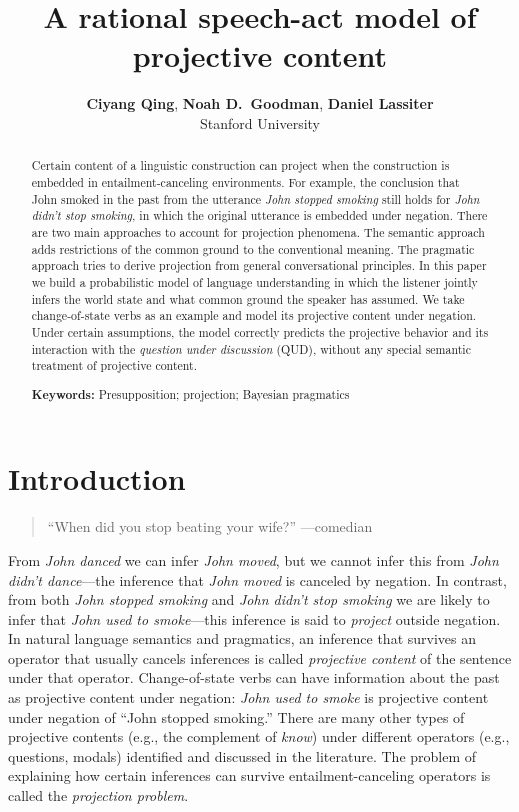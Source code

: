 \documentclass[10pt,letterpaper]{article}
\title{A rational speech-act model of projective content}
\author{{\large \bf Ciyang Qing}, {\large \bf Noah D.~Goodman}, {\large \bf Daniel Lassiter}\\
Stanford University}
\begin{document}
\maketitle
 
\begin{abstract}
Certain content of a linguistic construction can project when the construction is embedded in entailment-canceling environments.
 For example, the conclusion that John smoked in the past from the utterance \emph{John stopped smoking} 
 still holds for \emph{John didn't stop smoking}, in which the original utterance is 
 embedded under negation. 
 There are two main approaches to account for projection phenomena. 
 The semantic approach adds restrictions of the common ground to the conventional meaning.
 The pragmatic approach tries to derive projection from general conversational principles. 
 In this paper we build a probabilistic model of language understanding in which the listener 
  jointly infers the world state and what common ground the speaker has assumed. 
 We take change-of-state verbs as an example and model its projective content under negation. 
 Under certain assumptions, the model correctly predicts the projective behavior and its interaction with 
  the \emph{question under discussion} (QUD), without any special semantic treatment of projective content.

\textbf{Keywords:} 
Presupposition; projection; Bayesian pragmatics
\end{abstract}

\section{Introduction}
\label{sec:Intro}

\begin{quotation}
``When did you stop beating your wife?'' ---comedian
\end{quotation}

From \emph{John danced} we can infer \emph{John moved}, but we cannot infer this from \emph{John didn't dance}---the inference that \emph{John moved} is canceled by negation.
In contrast, from both \emph{John stopped smoking} and \emph{John didn't stop smoking} we are likely to infer that \emph{John used to smoke}---this inference is said to \emph{project} outside negation.
In natural language semantics and pragmatics, an inference that survives an operator that usually cancels inferences is called
 \emph{projective content} of the sentence under that operator. 
Change-of-state verbs can have information about the past as projective content under negation: \emph{John used to smoke} is projective content under negation of ``John stopped smoking.'' 
There are many other types of projective contents 
 (e.g., the complement of \emph{know}) under different operators 
 (e.g., questions, modals) identified and discussed in the literature. 
The problem of explaining how certain inferences can
 survive entailment-canceling operators is called the \emph{projection problem}.
\end{document}
